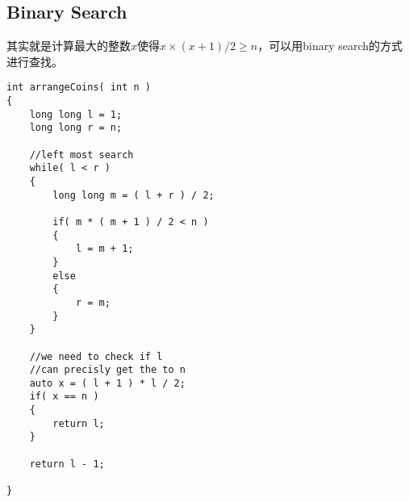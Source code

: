 \subsection{Binary Search}
其实就是计算最大的整数$x$使得$x\times(x+1)/2\geq n$，可以用binary search的方式进行查找。

\setcounter{lstlisting}{0}
\begin{lstlisting}[style=customc, caption={Binary Search}]
int arrangeCoins( int n )
{
    long long l = 1;
    long long r = n;

    //left most search
    while( l < r )
    {
        long long m = ( l + r ) / 2;

        if( m * ( m + 1 ) / 2 < n )
        {
            l = m + 1;
        }
        else
        {
            r = m;
        }
    }

    //we need to check if l
    //can precisly get the to n
    auto x = ( l + 1 ) * l / 2;
    if( x == n )
    {
        return l;
    }

    return l - 1;

}
\end{lstlisting}
